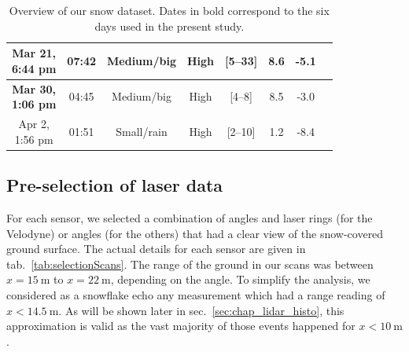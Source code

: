 \begin{table}[htbp]
\begin{tabular}{|c|c|c|c|c|c|c|c|}
        \makecell{\textbf{Mar 21,} \\ \textbf{6:44 pm}}  & 07:42 & Medium/big & High     & [5--33]  & 8.6 & -5.1  \\\hline
        \makecell{\textbf{Mar 30,} \\ \textbf{1:06 pm}}  & 04:45 & Medium/big & High     & [4--8]   & 8.5 & -3.0  \\\hline
        \makecell{Apr 2, \\ 1:56 pm}                     & 01:51 & Small/rain & High     & [2--10]  & 1.2 & -8.4  \\\hline
    \end{tabular}
    \caption{Overview of our snow dataset. Dates in bold correspond to the six days used in the present study.}
    \label{tab:overview-dataset}
\end{table}

\subsection{Pre-selection of laser data}
For each sensor, we selected a combination of angles and laser rings (for the Velodyne) or angles (for the others) that had a clear view of the snow-covered ground surface. The actual details for each sensor are given in tab.~\ref{tab:selectionScans}. The range of the ground in our scans was between $x = \SI{15}{\meter}$ to $x=\SI{22}{\meter}$, depending on the angle. To simplify the analysis, we considered as a snowflake echo any measurement which had a range reading of $x<\SI{14.5}{\meter}$. As will be shown later in sec.~\ref{sec:chap_lidar_histo}, this approximation is valid as the vast majority of those events happened for $x<\SI{10}{\meter}$. %

